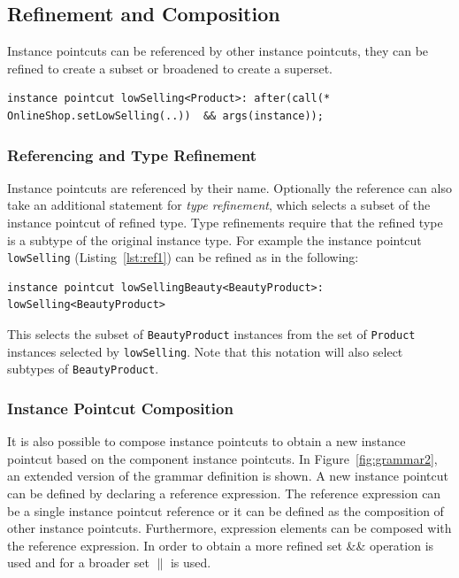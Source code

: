 \documentclass{llncs}
\begin{document}
\subsection{Refinement and Composition}

Instance pointcuts can be referenced by other instance pointcuts, they can be refined to create a subset or broadened to create a superset. 

\begin{lstlisting}[float=h!, caption={An instance pointcut selecting low-selling products}, label={lst:ref1}]
instance pointcut lowSelling<Product>: after(call(* OnlineShop.setLowSelling(..))  && args(instance));
\end{lstlisting}

\subsubsection{Referencing and Type Refinement}
Instance pointcuts are referenced by their name. Optionally the reference can also take an additional statement for \emph{type refinement}, which selects a subset of the instance pointcut of refined type. Type refinements require that the refined type is a subtype of the original instance type. For example the instance pointcut \texttt{lowSelling} (Listing~\ref{lst:ref1}) can be refined as in the following:
\begin{lstlisting}[float=h!]
instance pointcut lowSellingBeauty<BeautyProduct>: lowSelling<BeautyProduct>
\end{lstlisting}

This selects the subset of \texttt{BeautyProduct} instances from the set of \texttt{Product} instances selected by \texttt{lowSelling}. 
Note that this notation will also select subtypes of \texttt{BeautyProduct}. 

\subsubsection{Instance Pointcut Composition}
It is also possible to compose instance pointcuts to obtain a new instance pointcut based on the component instance pointcuts. In Figure~\ref{fig:grammar2}, an extended version of the grammar definition is shown. A new instance pointcut can be defined by declaring a reference expression. The reference expression can be a single instance pointcut reference or it can be defined as the composition of other instance pointcuts.  Furthermore, expression elements can be composed with the reference expression. In order to obtain a more refined set \&\& operation is used and for a broader set $\|$ is used. 
\end{document}
